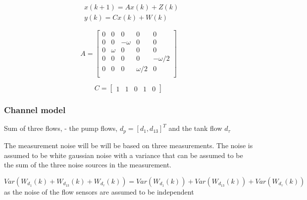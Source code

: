 \begin{align}
	&x(k+1) = Ax(k) + Z(k)  \label{eq:KalmanSystemEquations2} \\
	&y(k) = Cx(k)+W(k)
\end{align}

\begin{equation}
	A = \begin{bmatrix}
		0 & 0 		& 0			& 0 		& 0 		\\
		0 & 0 		& -\omega	& 0 		& 0 		\\
		0 & \omega 	& 0			& 0 		& 0 		\\
		0 & 0		& 0			& 0 		& -\omega/2 \\
		0 & 0		& 0			& \omega/2 	& 0 		\\
	\end{bmatrix}
\end{equation}

\begin{equation}
	C = \begin{bmatrix}
		1 & 1 & 0 & 1 & 0 
	\end{bmatrix}
\end{equation}


\subsubsection{Channel model}
Sum of three flows, - the pump flows, $d_p = [d_1, d_{13}]^T$ and the tank flow $d_{\tau}$

The measurement noise will be will be based on three measurements. The noise is assumed to be white gaussian noise with a variance that can be assumed to be the sum of the three noise sources in the measurement. 

\begin{equation}
	Var(W_{d_{1}}(k) + W_{d_{13}}(k) + W_{d_{\tau}}(k)) = Var(W_{d_{1}}(k)) + Var(W_{d_{13}}(k)) +Var(W_{d_{\tau}}(k))
\end{equation}
as the noise of the flow sensors are assumed to be independent 

